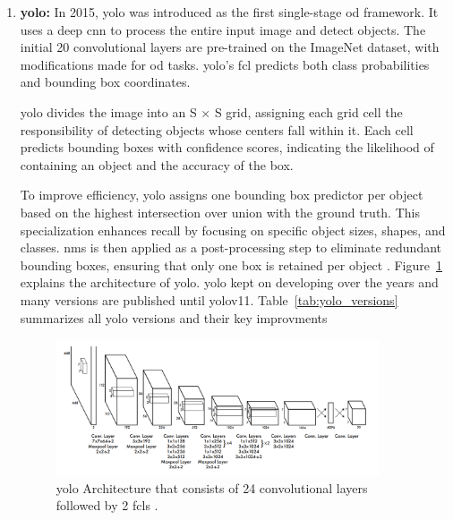 \begin{enumerate}
    \item \textbf{\gls{yolo}:} In 2015, \gls{yolo} was introduced as the first single-stage \gls{od} framework. It uses a deep \gls{cnn} to process the entire input image and detect objects. The initial 20 convolutional layers are pre-trained on the ImageNet dataset, with modifications made for \gls{od} tasks. \gls{yolo}’s \gls{fcl} predicts both class probabilities and bounding box coordinates.

    \gls{yolo} divides the image into an S × S grid, assigning each grid cell the responsibility of detecting objects whose centers fall within it. Each cell predicts bounding boxes with confidence scores, indicating the likelihood of containing an object and the accuracy of the box.

    To improve efficiency, \gls{yolo} assigns one bounding box predictor per object based on the highest intersection over union with the ground truth. This specialization enhances recall by focusing on specific object sizes, shapes, and classes. \gls{nms} is then applied as a post-processing step to eliminate redundant bounding boxes, ensuring that only one box is retained per object \cite{YOLO}. Figure~\ref{YOLO} explains the architecture of \gls{yolo}. \gls{yolo} kept on developing over the years and many versions are published until \gls{yolo}v11. Table~\ref{tab:yolo_versions} summarizes all \gls{yolo} versions and their key improvments

    \begin{figure}[ht]
        \centering
        \includegraphics[width=0.9\textwidth]{Figures/YOLO.PNG} 
        \caption{\gls{yolo} Architecture that consists of 24 convolutional layers followed by 2 \gls{fcl}s \cite{YOLO}.}
        \label{YOLO}
    \end{figure}



\end{enumerate}
